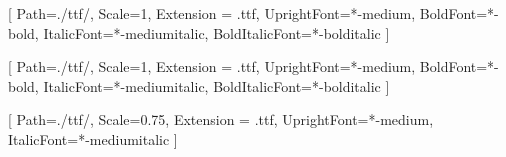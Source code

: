 
\setlength{\headsep}{1cm}
\setlength{\footskip}{1cm}
\checkandfixthelayout[fixed]


\renewcommand{\familydefault}{\rmdefault}
\renewcommand{\baselinestretch}{1.5}
\setlength{\parindent}{1cm}
\setlength{\parskip}{0ex}


\setmainfont{poppins}[
  Path=./ttf/,
  Scale=1,
  Extension = .ttf,
  UprightFont=*-medium,
  BoldFont=*-bold,
  ItalicFont=*-mediumitalic,
  BoldItalicFont=*-bolditalic
]

\setsansfont{poppins}[
  Path=./ttf/,
  Scale=1,
  Extension = .ttf,
  UprightFont=*-medium,
  BoldFont=*-bold,
  ItalicFont=*-mediumitalic,
  BoldItalicFont=*-bolditalic
]

\setmonofont{dmmono}[
  Path=./ttf/,
  Scale=0.75,
  Extension = .ttf,
  UprightFont=*-medium,
  ItalicFont=*-mediumitalic
]


\setlength{\footnotemargin}{0.5em} %
\let\svfootnoterule\footnoterule %
\renewcommand\footnoterule{\vspace{1ex}\svfootnoterule\vspace{1ex}}
